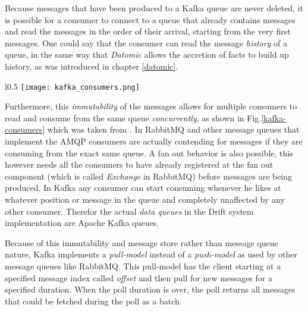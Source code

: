 Because messages that have been produced to a Kafka queue are
never deleted, it is possible for a consumer to connect to a queue
that already contains messages and read the messages in the order
of their arrival, starting from the very first messages. One could
say that the consumer can read the message \textit{history} of a
queue, in the same way that \textit{Datomic} allows the accretion
of facts to build up history, as was introduced in chapter \ref{datomic}.

\begin{wrapfigure}{l}{0.5\textwidth}
  \texttt{[image: kafka\_consumers.png]}
  \caption{Example showing multiple consumers independently reading from
           the same Apache Kafka queue at different positions.}
  \label{kafka-consumers}
\end{wrapfigure}

Furthermore, this \textit{immutability} of the messages allows
for multiple consumers to read and consume from the same queue
\textit{concurrently}, as shown in Fig.\ref{kafka-consumers} which
was taken from \cite{kafka}.
In RabbitMQ and other message queues that
implement the AMQP consumers are actually contending for messages
if they are consuming from the exact same queue. A fan out behavior
is also possible, this however needs all the consumers to have already
registered at the fan out component (which is called \textit{Exchange}
in RabbitMQ) before messages are being produced.
In Kafka any consumer can start consuming whenever he likes at
whatever position or message in the queue and completely unaffected
by any other consumer. Therefor the actual \textit{data queues}
in the Drift system implementation are Apache Kafka queues.

Because of this immutability and message store rather
than message queue nature, Kafka implements a \textit{pull-model}
instead of a \textit{push-model} as used by other message queues
like RabbitMQ. This pull-model has the client starting at a
specified message index called \textit{offset} and then pull
for new messages for a specified duration. When the poll
duration is over, the poll returns all messages that could be
fetched during the poll as a batch.

